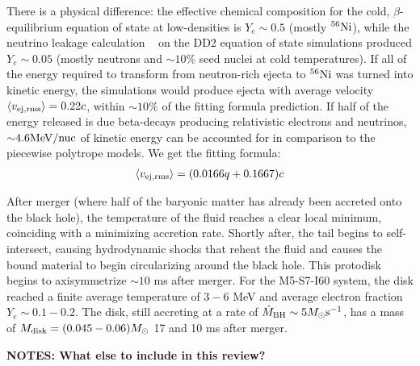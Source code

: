 There is a physical difference: the effective chemical composition for the cold, $\beta$-equilibrium equation of state at low-densities is $Y_e \sim 0.5$ (mostly $^{56}{\rm Ni}$), while the neutrino leakage calculation ~\cite{Ruffert1996,Rosswog:2003rv,OConnor2010} on the DD2 equation of state simulations produced $Y_e \sim 0.05$ (mostly neutrons and $\sim 10\%$ seed nuclei at cold temperatures).
If all of the energy required to transform from neutron-rich ejecta to $^{56}{\rm Ni}$ was turned into kinetic energy, the simulations would produce ejecta with average velocity $\left\langle v_{\rm ej, rms} \right\rangle = 0.22 c$, within $\sim 10\%$ of the fitting formula prediction.
If half of the energy released is due beta-decays producing relativistic electrons and neutrinos, $\mathord{\sim} 4.6 {\rm MeV/nuc}$ of kinetic energy can be accounted for in comparison to the piecewise polytrope models.
We get the fitting formula:
\begin{align}
\label{e:vej_spec}
\left\langle v_{\rm ej, rms} \right\rangle = (0.0166 q + 0.1667) c
\end{align}


After merger (where half of the baryonic matter has already been accreted onto the black hole), the temperature of the fluid reaches a clear local minimum, coinciding with a minimizing accretion rate.  Shortly after, the tail begins to self-intersect, causing hydrodynamic shocks that reheat the fluid and causes the bound material to begin circularizing around the black hole.  
This protodisk begins to axisymmetrize $\sim 10$ ms after merger.  
For the M5-S7-I60 system, the disk reached a finite average temperature of $3 - 6$ MeV and average electron fraction $Y_e \sim 0.1 - 0.2$.  The disk, still accreting at a rate of $\dot{M}_{\rm BH} \sim 5 M_\odot {\rm s}^{-1}$, has a mass of $M_{\rm disk} = (0.045 - 0.06) M_\odot$ 17 and 10 ms after merger.


\textbf{NOTES: What else to include in this review?}  